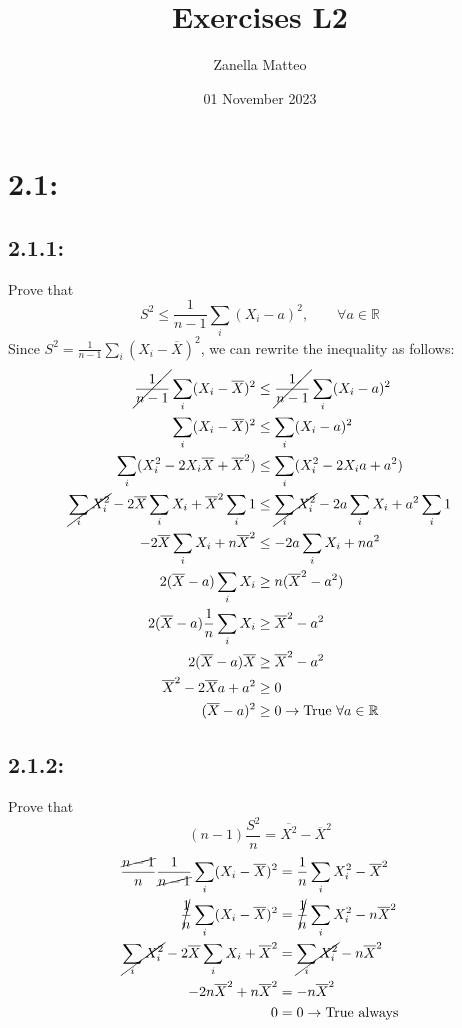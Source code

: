 \documentclass{article}
\title{Exercises L2}
\author{Zanella Matteo}
\date{01 November 2023}
\begin{document}
\maketitle

\section*{2.1:}
\subsection*{2.1.1:}
Prove that $$S^2\leq\frac{1}{n-1}\sum_{i}(X_i-a)^2,\qquad\forall a\in\mathbb{R}$$
\newline
Since $S^2=\frac{1}{n-1}\sum_{i}(X_i-\overline{X})^2$, we can rewrite the inequality as follows:
\begin{align*}
    \cancel{\frac{1}{n-1}}\sum_{i}(X_i-\overline{X})^2&\leq\cancel{\frac{1}{n-1}}\sum_{i}(X_i-a)^2\\
    \sum_{i}(X_i-\overline{X})^2&\leq\sum_{i}(X_i-a)^2\\
    \sum_i(X_i^2-2X_i\overline{X}+\overline{X}^2)&\leq\sum_i(X_i^2-2X_ia+a^2)\\
    \cancel{\sum_iX_i^2}-2\overline{X}\sum_iX_i+\overline{X}^2\sum_i1&\leq\cancel{\sum_iX_i^2}-2a\sum_iX_i+a^2\sum_i1\\
    -2\overline{X}\sum_iX_i+n\overline{X}^2&\leq-2a\sum_iX_i+na^2\\
    2(\overline{X}-a)\sum_iX_i&\geq n(\overline{X}^2-a^2)\\
    2(\overline{X}-a)\frac{1}{n}\sum_iX_i&\geq\overline{X}^2-a^2\\
    2(\overline{X}-a)\overline{X}&\geq\overline{X}^2-a^2\\
    \overline{X}^2-2\overline{X}a+a^2&\geq0\\
    (\overline{X}-a)^2&\geq0\rightarrow \text{True}\,\,\forall a\in\mathbb{R}
\end{align*}
\subsection*{2.1.2:}
Prove that $$(n-1)\frac{S^2}{n}=\overline{X^2}-\overline{X}^2$$
\newline
\begin{align*}
    \frac{\cancel{n-1}}{n}\frac{1}{\cancel{n-1}}\sum_i(X_i-\overline{X})^2&=\frac{1}{n}\sum_iX_i^2-\overline{X}^2\\
    \cancel{\frac{1}{n}}\sum_i(X_i-\overline{X})^2&=\cancel{\frac{1}{n}}\sum_iX_i^2-n\overline{X}^2\\
    \cancel{\sum_iX_i^2}-2\overline{X}\sum_iX_i+\overline{X}^2&=\cancel{\sum_iX_i^2}-n\overline{X}^2\\
    -2n\overline{X}^2+n\overline{X}^2&=-n\overline{X}^2\\
    0&=0\rightarrow\text{True always}
\end{align*}
\end{document}
